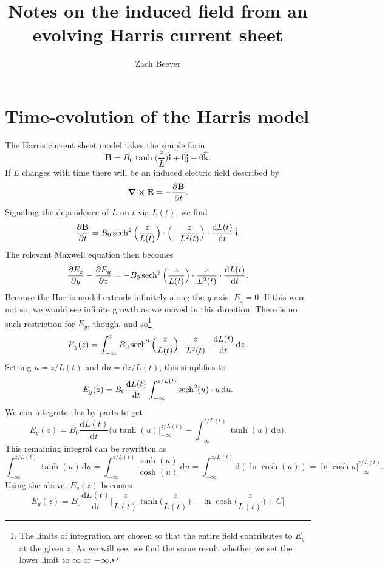 \documentclass{article}
\author{Zach Beever}
\title{Notes on the induced field from an evolving Harris current sheet}
\date{}
\begin{document}
	\maketitle
	
	\section{Time-evolution of the Harris model}
	
	The Harris current sheet model takes the simple form
	\[
		\mathbf{B} = B_0\tanh\Big(\frac{z}{L}\Big)\hat{\mathbf{i}} + 0\hat{\mathbf{j}} + 0\hat{\mathbf{k}}.
	\]
	If $L$ changes with time there will be an induced electric field described by 
	\[
		\curl{\mathbf{E}} = -\frac{\partial\mathbf{B}}{\partial t}.
	\]
	Signaling the dependence of $L$ on $t$ via $L(t)$, we find
	\[
		\frac{\partial\mathbf{B}}{\partial t} = B_0\sech^2\Big(\frac{z}{L(t)}\Big)\cdot\Big({-\frac{z}{L^2(t)}}\Big)\cdot\frac{\mathrm{d}L(t)}{\mathrm{d}t}\,\hat{\mathbf{i}}.
	\]
	The relevant Maxwell equation then becomes
	\[
		\frac{\partial E_z}{\partial y} - \frac{\partial E_y}{\partial z} = -B_0\sech^2\Big(\frac{z}{L(t)}\Big)\cdot\frac{z}{L^2(t)}\cdot\frac{\mathrm{d}L(t)}{\mathrm{d}t}.
	\]
	Because the Harris model extends infinitely along the $y$-axis, $E_z = 0$. If this were not so, we would see infinite growth as we moved in this direction. There is no such restriction for $E_y$, though, and so\footnote{The limits of integration are chosen so that the entire field contributes to $E_y$ at the given $z$. As we will see, we find the same result whether we set the lower limit to $\infty$ or $-\infty$.}
	\[
		E_y(z) = \int_{-\infty}^z B_0\sech^2\Big(\frac{z}{L(t)}\Big)\cdot\frac{z}{L^2(t)}\cdot\frac{\mathrm{d}L(t)}{\mathrm{d}t}\,\mathrm{d}z.
	\]
	Setting $u = z/L(t)$ and $\mathrm{d}u = \mathrm{d}z/L(t)$, this simplifies to
	\[
		E_y(z) = B_0\frac{\mathrm{d}L(t)}{\mathrm{d}t}\int_{-\infty}^{z/L(t)}\sech^2(u)\cdot u\,\mathrm{d}u.
	\]
	We can integrate this by parts to get
	\[
		E_y(z) = B_0\frac{\mathrm{d}L(t)}{\mathrm{d}t}\Big(u\tanh(u)\Big|_{-\infty}^{z/L(t)} - \int_{-\infty}^{z/L(t)}\tanh(u)\,\mathrm{d}u\Big).
	\]
	This remaining integral can be rewritten as
	\[
		\int_{-\infty}^{z/L(t)}\tanh(u)\,\mathrm{d}u = \int_{-\infty}^{z/L(t)}\frac{\sinh(u)}{\cosh(u)}\,\mathrm{d}u = \int_{-\infty}^{z/L(t)}\mathrm{d}(\ln{\cosh(u)}) = \ln\cosh u\Big|_{-\infty}^{z/L(t)}.
	\]
	Using the above, $E_y(z)$ becomes
	\[
		E_y(z) = B_0\frac{\mathrm{d}L(t)}{\mathrm{d}t}\Big[\frac{z}{L(t)}\tanh\Big(\frac{z}{L(t)}\Big)- \ln\cosh\Big(\frac{z}{L(t)} \Big) + C\Big]
	\]
\end{document}
